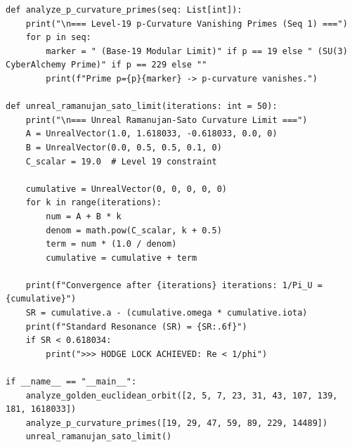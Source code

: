 \begin{verbatim}
def analyze_p_curvature_primes(seq: List[int]):
    print("\n=== Level-19 p-Curvature Vanishing Primes (Seq 1) ===")
    for p in seq:
        marker = " (Base-19 Modular Limit)" if p == 19 else " (SU(3) CyberAlchemy Prime)" if p == 229 else ""
        print(f"Prime p={p}{marker} -> p-curvature vanishes.")

def unreal_ramanujan_sato_limit(iterations: int = 50):
    print("\n=== Unreal Ramanujan-Sato Curvature Limit ===")
    A = UnrealVector(1.0, 1.618033, -0.618033, 0.0, 0)
    B = UnrealVector(0.0, 0.5, 0.5, 0.1, 0)
    C_scalar = 19.0  # Level 19 constraint
    
    cumulative = UnrealVector(0, 0, 0, 0, 0)
    for k in range(iterations):
        num = A + B * k
        denom = math.pow(C_scalar, k + 0.5)
        term = num * (1.0 / denom)
        cumulative = cumulative + term
        
    print(f"Convergence after {iterations} iterations: 1/Pi_U = {cumulative}")
    SR = cumulative.a - (cumulative.omega * cumulative.iota)
    print(f"Standard Resonance (SR) = {SR:.6f}")
    if SR < 0.618034:
        print(">>> HODGE LOCK ACHIEVED: Re < 1/phi")
        
if __name__ == "__main__":
    analyze_golden_euclidean_orbit([2, 5, 7, 23, 31, 43, 107, 139, 181, 1618033])
    analyze_p_curvature_primes([19, 29, 47, 59, 89, 229, 14489])
    unreal_ramanujan_sato_limit()
\end{verbatim}

